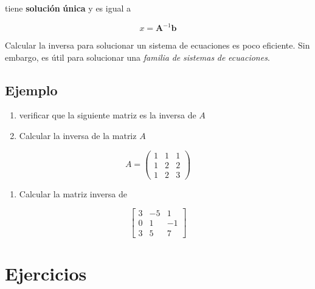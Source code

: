 \documentclass[
]{article}
\providecommand{\tightlist}{%
  \setlength{\itemsep}{0pt}\setlength{\parskip}{0pt}}
\begin{document}
tiene \textbf{solución} \textbf{única} y es igual a

\begin{equation*} \label{sistema}
  x = \mathbf{A}^{-1}\mathbf{b}
\end{equation*}

Calcular la inversa para solucionar un sistema de ecuaciones es poco
eficiente. Sin embargo, es útil para solucionar una \emph{familia}
\emph{de} \emph{sistemas} \emph{de} \emph{ecuaciones}.

\hypertarget{ejemplo-4}{%
\subsection{Ejemplo}\label{ejemplo-4}}

\begin{enumerate}
\def\labelenumi{\arabic{enumi}.}
\item
  verificar que la siguiente matriz es la inversa de \(A\)
\item
  Calcular la inversa de la matriz \(A\)
\end{enumerate}

\begin{equation*}
  A = \begin{pmatrix}
          1 & 1 & 1 \\
          1 & 2 & 2 \\
          1 & 2 & 3 
      \end{pmatrix}
\end{equation*}

\begin{enumerate}
\def\labelenumi{\arabic{enumi}.}
\tightlist
\item
  Calcular la matriz inversa de
\end{enumerate}

\begin{equation*}
 \begin{bmatrix} 3 & -5 & 1   \\  
                 0 & 1  & -1  \\ 
                 3 & 5  & 7   
 \end{bmatrix}  
\end{equation*}

\hypertarget{ejercicios-1}{%
\section{Ejercicios}\label{ejercicios-1}}
\end{document}
